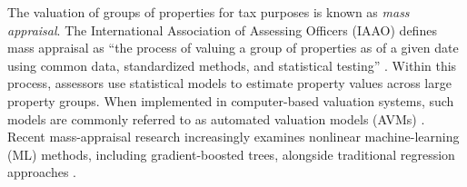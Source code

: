 \documentclass[10pt]{article}
\theoremstyle{definition}
\newcommand{\1}{\mathbf{1}}
\begin{document}
The {valuation} of groups of properties for tax purposes is known as \emph{mass appraisal}. The International Association of Assessing Officers (IAAO) defines mass appraisal as ``the process of valuing a group of properties as of a given date using common data, standardized methods, and statistical testing'' \cite{IAAO2025Mass}. Within this process, assessors use statistical models to estimate property values across large property groups. {When implemented in computer-based valuation systems, such models are commonly referred to as automated valuation models (AVMs)} \cite{IAAOAITaskForce2022,BidansetRakow2022}. Recent mass-appraisal research increasingly examines nonlinear machine-learning (ML) methods, including gradient-boosted trees, alongside traditional regression approaches \cite{Rootetal2023,Sevgen2024100111,Zilli2024}. %
\end{document}
